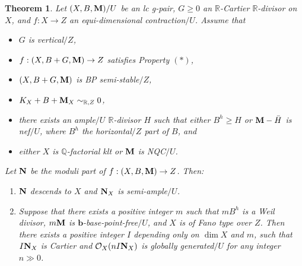 \documentclass[11pt]{amsart}
\numberwithin{equation}{section}
\newcommand{\bb}{\bm{b}}
\newcommand{\Mm}{{\bf{M}}}
\newcommand{\Nn}{{\bf{N}}}
\newcommand{\Qq}{\mathbb{Q}}
\newcommand{\Rr}{\mathbb{R}}
\newtheorem{thm}{Theorem}[subsection]
\theoremstyle{definition}
\theoremstyle{definition}
\theoremstyle{definition}
\begin{document}
\begin{thm}\label{thm: special b-semiampleness lc trivial}
Let $(X,B,\Mm)/U$ be an lc g-pair, $G\geq 0$ an $\Rr$-Cartier $\Rr$-divisor on $X$, and $f: X\rightarrow Z$ an equi-dimensional contraction$/U$. Assume that
\begin{itemize}
    \item $G$ is vertical$/Z$,
    \item $f: (X,B+G,\Mm)\rightarrow Z$ satisfies Property $(*)$,
    \item $(X,B+G,\Mm)$ is BP semi-stable$/Z$,
    \item $K_X+B+\Mm_X\sim_{\mathbb R,Z}0$,
    \item there exists an ample$/U$ $\Rr$-divisor $H$ such that either $B^h\geq H$ or $\Mm-\bar H$ is nef$/U$, where $B^h$ the horizontal$/Z$ part of $B$, and
    \item either $X$ is $\Qq$-factorial klt or $\Mm$ is NQC$/U$.
\end{itemize}
Let $\Nn$ be the moduli part of  $f: (X,B,\Mm)\rightarrow Z$. Then:
\begin{enumerate}
    \item $\Nn$ descends to $X$ and $\Nn_X$ is semi-ample$/U$.
    \item Suppose that there exists a positive integer $m$ such that $mB^h$ is a Weil divisor, $m\Mm$ is $\bb$-base-point-free$/U$, and $X$ is of Fano type over $Z$. Then there exists a positive integer $I$ depending only on $\dim X$ and $m$, such that $I\Nn_X$ is Cartier and $\mathcal{O}_X(nI\Nn_X)$ is globally generated$/U$ for any integer $n\gg 0$.
\end{enumerate}
\end{thm}
\end{document}
